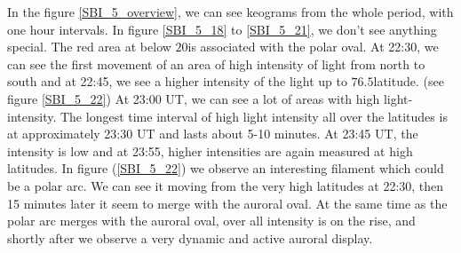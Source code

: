 \documentclass[10pt,a4paper]{article}
\begin{document}
In the figure \ref{SBI_5_overview}, we can see keograms from the whole period, with one hour intervals. In figure \ref{SBI_5_18} to \ref{SBI_5_21}, we don't see anything 
special. The red area at below $20$\textdegree is associated with the polar oval. At 22:30, we can see the first movement of an area of high intensity of light from north to 
south and at 22:45, we see a higher intensity of the light up to $76.5$\textdegree latitude. (see figure \ref{SBI_5_22})
At 23:00 UT, we can see a lot of areas with high light-intensity. The longest time interval of high light intensity all over the latitudes is at approximately 23:30 UT and lasts about 5-10 minutes. At 23:45 UT, the intensity is low and at 23:55, higher intensities are again measured at high latitudes. In figure (\ref{SBI_5_22}) we 
observe an interesting filament which could be a polar arc. We can see it moving from the very high latitudes at 22:30, then 15 minutes later it seem to merge with the auroral oval. At the same time as the polar arc merges with the auroral oval, over all intensity is on the rise, and shortly after we observe a very dynamic and active auroral display.  
\end{document}

